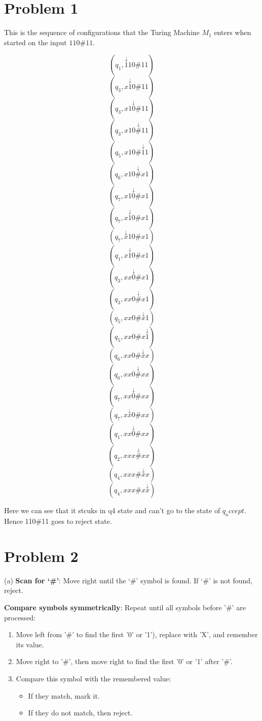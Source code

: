 \documentclass[12 pt]{article}
\begin{document}
\section*{Problem 1}

This is the sequence of configurations that the Turing Machine \(M_1\) enters when started on the input \(110\#11\).

\[
(q_1, \stackrel{\downarrow}{1}10\#11)
\]
\[
(q_3, x\stackrel{\downarrow}{1}0\#11)
\]
\[
(q_3, x1\stackrel{\downarrow}{0}\#11)
\]
\[
(q_3, x10\stackrel{\downarrow}{\#}11)
\]
\[
(q_5, x10\#\stackrel{\downarrow}{1}1)
\]
\[
(q_6, x10\stackrel{\downarrow}{\#}x1)
\]
\[
(q_7, x1\stackrel{\downarrow}{0}\#x1)
\]
\[
(q_7, x\stackrel{\downarrow}{1}0\#x1)
\]
\[
(q_7, \stackrel{\downarrow}{x}10\#x1)
\]
\[
(q_1, x\stackrel{\downarrow}{1}0\#x1)
\]
\[
(q_3, xx\stackrel{\downarrow}{0}\#x1)
\]
\[
(q_3, xx0\stackrel{\downarrow}{\#}x1)
\]
\[
(q_5, xx0\#\stackrel{\downarrow}{x}1)
\]
\[
(q_5, xx0\#x\stackrel{\downarrow}{1})
\]
\[
(q_6, xx0\#\stackrel{\downarrow}{x}x)
\]
\[
(q_6, xx0\stackrel{\downarrow}{\#}xx)
\]
\[
(q_7, xx\stackrel{\downarrow}{0}\#xx)
\]
\[
(q_7, x\stackrel{\downarrow}{x}0\#xx)
\]
\[
(q_1, xx\stackrel{\downarrow}{0}\#xx)
\]
\[
(q_2, xxx\stackrel{\downarrow}{\#}xx)
\]
\[
(q_4, xxx\#\stackrel{\downarrow}{x}x)
\]
\[
(q_4, xxx\#x\stackrel{\downarrow}{x})
\]

Here we can see that it stcuks in q4 state and can't go to the state of $q_accept$. Hence 110\#11 goes to reject state.


\vspace{1cm}

\section*{Problem 2}

(a) 
\textbf{Scan for ‘\#’}: Move right until the ‘\#’ symbol is found. If ‘\#’ is not found, reject.


\textbf{Compare symbols symmetrically}: Repeat until all symbols before '\#' are processed:
    \begin{enumerate}
        \item Move left from '\#' to find the first '0' or '1'), replace with 'X', and remember its value.
        \item Move right to '\#', then move right to find the first '0' or '1' after '\#'.
        \item Compare this symbol with the remembered value:
        \begin{itemize}
            \item If they match, mark it.
            \item If they do not match, then reject.
        \end{itemize}
    \end{enumerate}
\end{document}
